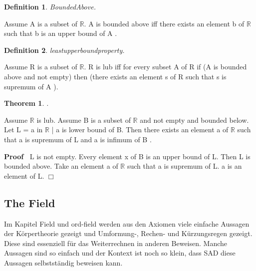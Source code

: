 \documentclass{article}
\newenvironment{forthel}{\begin{leftbar}}{\end{leftbar}}
\newenvironment{proof}{\noindent\textbf{Proof\ }}{\hspace*{\fill}$\Box$\medskip}
\newtheorem{theorem}{Theorem}
\newtheorem{definition}{Definition}
\begin{document}
\begin{forthel}
\begin{definition} BoundedAbove.

\end{definition}
Assume A is a subset of $\mathbb{R}$.
A is bounded above  iff 
there exists an element b of $\mathbb{R}$ such that b is an upper bound of A .

\begin{definition} leastupperboundproperty.

\end{definition}
Assume R is a subset of $\mathbb{R}$.
R is lub iff for every subset A of R
if (A is bounded above and not empty) then (there exists an element s of R such that s is supremum of A ).

\begin{theorem}
.
\end{theorem}
Assume $\mathbb{R}$ is lub.
Assume B is a subset of $\mathbb{R}$ and not empty and bounded below.
Let L = {a in $\mathbb{R}$ | a is lower bound of B}.
Then there exists an element a of $\mathbb{R}$ such that a is supremum of L and a is infimum of B .

\begin{proof}
L is not empty.
Every element x of B is an upper bound of L.
Then L is bounded above.
Take an element a of $\mathbb{R}$ such that a is supremum of L.
a is an element of L.
\end{proof}





\end{forthel}

\subsection{The Field}

Im Kapitel Field und ord-field werden aus den Axiomen viele einfache Aussagen der Körpertheorie gezeigt und Umformung-, Rechen- und Kürzungsregen gezeigt. Diese sind essenziell für das Weiterrechnen in anderen Beweisen.
Manche Aussagen sind so einfach und der Kontext ist noch so klein, dass SAD diese Aussagen selbstst\"andig beweisen kann.
\end{document}
